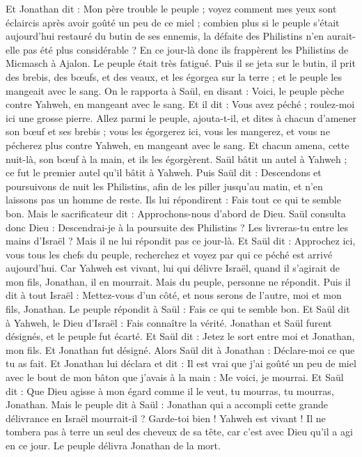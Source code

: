 \begin{multicols}{2}
Et Jonathan dit : Mon père trouble le peuple ; voyez comment mes yeux sont éclaircis après avoir goûté un peu de ce miel ;
combien plus si le peuple s'était aujourd'hui restauré du butin de ses ennemis, la défaite des Philistins n'en aurait-elle pas été plus considérable ?
En ce jour-là donc ils frappèrent les Philistins de Micmasch à Ajalon. Le peuple était très fatigué.
Puis il se jeta sur le butin, il prit des brebis, des bœufs, et des veaux, et les égorgea sur la terre ; et le peuple les mangeait avec le sang.
On le rapporta à Saül, en disant : Voici, le peuple pèche contre Yahweh, en mangeant avec le sang. Et il dit : Vous avez péché ; roulez-moi ici une grosse pierre.
Allez parmi le peuple, ajouta-t-il, et dites à chacun d'amener son bœuf et ses brebis ; vous les égorgerez ici, vous les mangerez, et vous ne pécherez plus contre Yahweh, en mangeant avec le sang. Et chacun amena, cette nuit-là, son bœuf à la main, et ils les égorgèrent.
Saül bâtit un autel à Yahweh ; ce fut le premier autel qu'il bâtit à Yahweh.
Puis Saül dit : Descendons et poursuivons de nuit les Philistins, afin de les piller jusqu'au matin, et n'en laissons pas un homme de reste. Ils lui répondirent : Fais tout ce qui te semble bon. Mais le sacrificateur dit : Approchons-nous d'abord de Dieu.
Saül consulta donc Dieu : Descendrai-je à la poursuite des Philistins ? Les livreras-tu entre les mains d'Israël ? Mais il ne lui répondit pas ce jour-là.
Et Saül dit : Approchez ici, vous tous les chefs du peuple, recherchez et voyez par qui ce péché est arrivé aujourd'hui.
Car Yahweh est vivant, lui qui délivre Israël, quand il s'agirait de mon fils, Jonathan, il en mourrait. Mais du peuple, personne ne répondit.
Puis il dit à tout Israël : Mettez-vous d'un côté, et nous serons de l'autre, moi et mon fils, Jonathan. Le peuple répondit à Saül : Fais ce qui te semble bon.
Et Saül dit à Yahweh, le Dieu d'Israël : Fais connaître la vérité. Jonathan et Saül furent désignés, et le peuple fut écarté.
Et Saül dit : Jetez le sort entre moi et Jonathan, mon fils. Et Jonathan fut désigné.
Alors Saül dit à Jonathan : Déclare-moi ce que tu as fait. Et Jonathan lui déclara et dit : Il est vrai que j'ai goûté un peu de miel avec le bout de mon bâton que j'avais à la main : Me voici, je mourrai.
Et Saül dit : Que Dieu agisse à mon égard comme il le veut, tu mourras, tu mourras, Jonathan.
Mais le peuple dit à Saül : Jonathan qui a accompli cette grande délivrance en Israël mourrait-il ? Garde-toi bien ! Yahweh est vivant ! Il ne tombera pas à terre un seul des cheveux de sa tête, car c'est avec Dieu qu'il a agi en ce jour. Le peuple délivra Jonathan de la mort.

\end{multicols}

